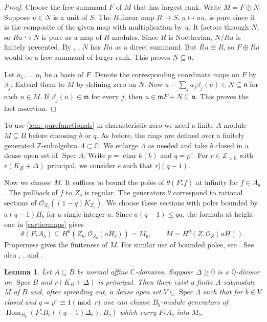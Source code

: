 \documentclass[11pt,leqno]{amsart}
\numberwithin{equation}{section}
\newtheorem{lemma}[theorem]{Lemma}
\theoremstyle{definition}
\theoremstyle{remark}
\renewcommand{\O}{\mathcal{O}}
\newcommand{\C}{\mathbb{C}}
\newcommand{\Q}{\mathbb{Q}}
\newcommand{\Z}{\mathbb{Z}}
\newcommand{\Spec}{\operatorname{Spec}}
\providecommand{\frm}{}
\renewcommand{\frm}{\mathfrak{m}}
\newcommand{\stacktag}[1]{\href{https://stacks.math.columbia.edu/tag/#1}{#1}}
\DeclareMathOperator{\Hom}{Hom}
\begin{document}
\begin{proof}
Choose the free summand $F$ of $M$ that has largest rank. Write $M=F\oplus N$.
Suppose $u\in N$ is a unit of $S$. The $R$-linear map $R\to S$, $a\mapsto au$, is pure since it is the composite of the given map with multiplication by $u$. It factors through $N$, so $Ru\hookrightarrow N$ is pure as a map of $R$-modules. Since $R$ is Noetherian, $N/Ru$ is finitely presented. By \cite[Corollary 5.2]{HR76}, \cite[\stacktag{058L}]{stacks-project}, $N$ has $Ru$ as a direct summand. But $Ru\cong R$, so $F\oplus Ru$ would be a free summand of larger rank. This proves $N\subseteq\mathfrak{n}$.

Let $a_1,\dots,a_t$ be a basis of $F$. Denote the corresponding coordinate maps on $F$ by $\beta_j$. Extend them to $M$ by defining zero on $N$. Now $u - \sum_j a_j\beta_j(u) \in N \subseteq \mathfrak{n}$ for each $u \in M$. If $\beta_j(u) \in \frm$ for every $j$, then $u \in \frm F + N \subseteq \mathfrak{n}$. This proves the last assertion.
\end{proof}

To use \cref{lem: purefunctionals} in characteristic zero we need a finite $A$-module $M \subseteq B$ before choosing $b$ or $q$. As before, the rings are defined over a finitely generated $\Z$-subalgebra $\Lambda \subset \C$. We enlarge $\Lambda$ as needed and take $b$ closed in a dense open set of $\Spec\Lambda$. Write $p = \operatorname{char} k(b)$ and $q = p^e$. For $r\in\Z_{>0}$ with $r(K_B + \Delta)$ principal, we consider $e$ such that $r| (q - 1)$.

Now we choose $M$. It suffices to bound the poles of $\theta(F^e_*f)$ at infinity for $f \in A_b$. The pullback of $f$ to $Z_b$ is regular. The generators $\theta$ correspond to rational sections of $\O_{Z_b}((1-q)K_{Z_b})$. We choose these sections with poles bounded by $a(q-1)H_b$ for a single integer $a$. Since $a(q - 1) \leq qa$, the formula at height one in \cref{cartiermaps} gives
\[
 \theta(F^e_*A_b) \subseteq H^0(Z_b,\O_{Z_b}(aH_b)) = M_b,\qquad M = H^0(Z,\O_Z(aH)).
\]
Properness gives the finiteness of $M$. For similar use of bounded poles, see \cite[Section 8.4, Lemma 8.4.6]{BP09}. See also \cite[Proposition 3]{Anderson2000}, \cite[Proposition 4.5]{Bli13}, and \cite[Proposition 7.6]{BS19}.

\begin{lemma} \label{lem: finitemodule}
Let $A \subseteq B$ be normal affine $\C$-domains. Suppose $\Delta \geq 0$ is a $\Q$-divisor on $\Spec B$ and $r(K_B + \Delta)$ is principal. Then there exist a finite $A$-submodule $M$ of $B$ and, after spreading out, a dense open set $V \subseteq \Spec\Lambda$ such that for $b \in V$ closed and $q = p^e \equiv 1\pmod r$ one can choose $B_b$-module generators of $\Hom_{B_b}(F^e_*B_b((q - 1)\Delta_b),B_b)$ which carry $F^e_*A_b$ into $M_b$.
\end{lemma}
\end{document}
